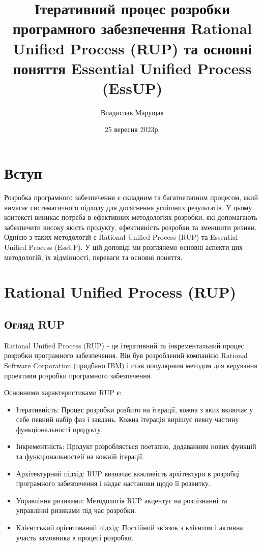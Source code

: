 \documentclass[letterpaper]{report}
\title{Ітеративний процес розробки програмного забезпечення Rational Unified Process (RUP) та основні поняття Essential Unified Process (EssUP)}
\author{Владислав Марущак}
\date{25 вересня 2023р.}
\begin{document}
	\maketitle

	\tableofcontents

	\section*{Вступ}

		Розробка програмного забезпечення є складним та багатоетапним процесом, який вимагає систематичного підходу для досягнення успішних результатів. У цьому контексті виникає потреба в ефективних методологіях розробки, які допомагають забезпечити високу якість продукту, ефективність розробки та зменшити ризики. Однією з таких методологій є Rational Unified Process (RUP) та Essential Unified Process (EssUP). У цій доповіді ми розглянемо основні аспекти цих методологій, їх відмінності, переваги та основні поняття.

	\section{Rational Unified Process (RUP)}  

		\subsection{Огляд RUP}

			Rational Unified Process (RUP) - це ітеративний та інкрементальний процес розробки програмного забезпечення. Він був розроблений компанією Rational Software Corporation (придбано IBM) і став популярним методом для керування проектами розробки програмного забезпечення.

			Основними характеристиками RUP є:

		\begin{itemize}
			\item Ітеративність: Процес розробки розбито на ітерації, кожна з яких включає у себе певний набір фаз і завдань. Кожна ітерація вирішує певну частину функціональності продукту.
			\item Інкрементність: Продукт розробляється поетапно, додаванням нових функцій та функціональностей на кожній ітерації.
			\item Архітектурний підхід: RUP визначає важливість архітектури в розробці програмного забезпечення і надає настанови щодо її розвитку.
			\item Управління ризиками: Методологія RUP акцентує на розпізнанні та управлінні ризиками під час розробки.
			\item Клієнтський орієнтований підхід: Постійний зв'язок з клієнтом і активна участь замовника в процесі розробки.
		\end{itemize}
\end{document}
